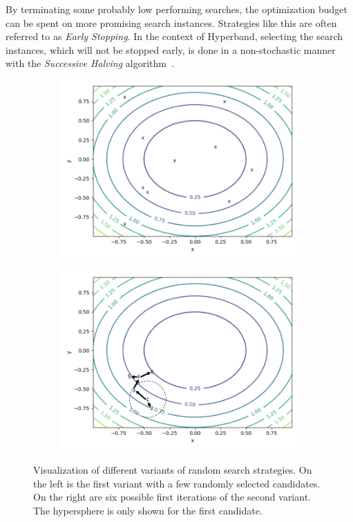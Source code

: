 By terminating some probably low performing searches, the optimization budget can be spent on more promising search instances.
Strategies like this are often referred to as \textit{Early Stopping}.
In the context of Hyperband, selecting the search instances, which will not be stopped early, is done in a non-stochastic manner with the \textit{Successive Halving} algorithm~\cite{Jamieson-SuccessiveHalving}.
\begin{figure}[ht!]
    \centering
    \begin{subfigure}{0.48\textwidth}
        \includegraphics[width=\textwidth]{gfx/Figures/Theory/RandomSearch.pdf}
    \end{subfigure}
    \begin{subfigure}{0.48\textwidth}
        \includegraphics[width=\textwidth]{gfx/Figures/Theory/RandomSearchHypersphere.pdf}
    \end{subfigure}
    \caption[Visualization of different variants of random search strategies.]{Visualization of different variants of random search strategies. On the left is the first variant with a few randomly selected candidates. On the right are six possible first iterations of the second variant. The hypersphere is only shown for the first candidate.}
    \label{fig:theory:random-search}
\end{figure}


